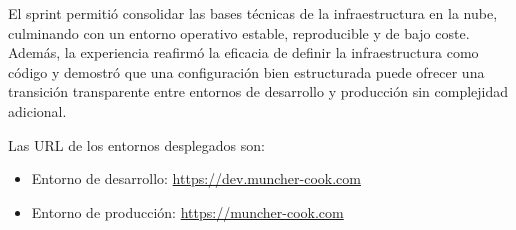 El sprint permitió consolidar las bases técnicas de la infraestructura en la
nube, culminando con un entorno operativo estable, reproducible y de bajo
coste. Además, la experiencia reafirmó la eficacia de definir la infraestructura
como código y demostró que una configuración bien estructurada puede ofrecer una
transición transparente entre entornos de desarrollo y producción sin
complejidad adicional.

Las URL de los entornos desplegados son:

\begin{itemize}
	\item Entorno de desarrollo: \url{https://dev.muncher-cook.com}
	\item Entorno de producción: \url{https://muncher-cook.com}
\end{itemize}
